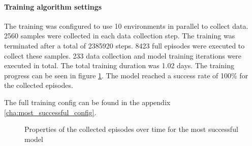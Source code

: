 \paragraph{Training algorithm settings}
The training was configured to use 10 environments in parallel to collect data. 2560 samples were collected in each data collection step. The training was terminated after a total of 2385920 steps. 8423 full episodes were executed to collect these samples. 233 data collection and model training iterations were executed in total. The total training duration was 1.02 days.
The training progress can be seen in figure \ref{fig:training_most_successful_model}. The model reached a success rate of 100\% for the collected episodes.


The full training config can be found in the appendix \ref{cha:most_successful_config}.

\begin{figure}
    \centering
    \caption{Properties of the collected episodes over time for the most successful model}
    \label{fig:training_most_successful_model}
\end{figure}